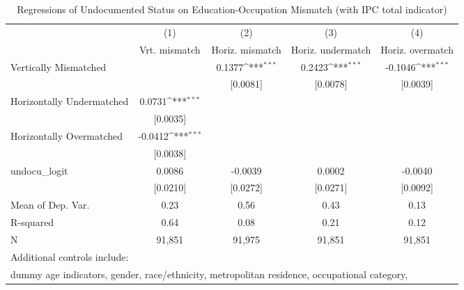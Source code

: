 \begin{table}[htbp]\centering
\def\sym#1{\ifmmode^{#1}\else\(^{#1}\)\fi}
\caption{Regressions of Undocumented Status on Education-Occupation Mismatch (with IPC total indicator)}
\begin{tabular}{l*{4}{c}}
\toprule
                    &\multicolumn{1}{c}{(1)}         &\multicolumn{1}{c}{(2)}         &\multicolumn{1}{c}{(3)}         &\multicolumn{1}{c}{(4)}         \\
                    &Vrt. mismatch         &Horiz. mismatch         &Horiz. undermatch         &Horiz. overmatch         \\
\midrule
Vertically Mismatched&                     &      0.1377\sym{***}&      0.2423\sym{***}&     -0.1046\sym{***}\\
                    &                     &    [0.0081]         &    [0.0078]         &    [0.0039]         \\
\addlinespace
Horizontally Undermatched&      0.0731\sym{***}&                     &                     &                     \\
                    &    [0.0035]         &                     &                     &                     \\
\addlinespace
Horizontally Overmatched&     -0.0412\sym{***}&                     &                     &                     \\
                    &    [0.0038]         &                     &                     &                     \\
\addlinespace
undocu\_logit        &      0.0086         &     -0.0039         &      0.0002         &     -0.0040         \\
                    &    [0.0210]         &    [0.0272]         &    [0.0271]         &    [0.0092]         \\
\midrule
Mean of Dep. Var.   &        0.23         &        0.56         &        0.43         &        0.13         \\
R-squared           &        0.64         &        0.08         &        0.21         &        0.12         \\
N                   &      91,851         &      91,975         &      91,851         &      91,851         \\
\bottomrule
\multicolumn{5}{l}{\footnotesize Additional controls include:}\\
\multicolumn{5}{l}{\footnotesize dummy age indicators, gender, race/ethnicity, metropolitan residence, occupational category,}\\

\end{tabular}
\end{table}

